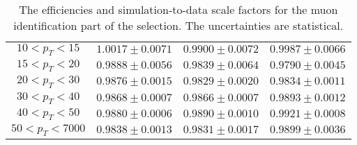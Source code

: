 \begin{table}[!ht]
\begin{center}
\begin{tabular}{c|c|c|c}
\hline 
$ 10 < p_T <  15$ & $1.0017 \pm 0.0071$ & $0.9900 \pm 0.0072$ & $0.9987 \pm 0.0066$  \\
$ 15 < p_T <  20$ & $0.9888 \pm 0.0056$ & $0.9839 \pm 0.0064$ & $0.9790 \pm 0.0045$  \\
$ 20 < p_T <  30$ & $0.9876 \pm 0.0015$ & $0.9829 \pm 0.0020$ & $0.9834 \pm 0.0011$  \\
$ 30 < p_T <  40$ & $0.9868 \pm 0.0007$ & $0.9866 \pm 0.0007$ & $0.9893 \pm 0.0012$  \\
$ 40 < p_T <  50$ & $0.9880 \pm 0.0006$ & $0.9890 \pm 0.0010$ & $0.9921 \pm 0.0008$  \\
$ 50 < p_T < 7000$ & $0.9838 \pm 0.0013$ & $0.9831 \pm 0.0017$ & $0.9899 \pm 0.0036$  \\
\hline
\end{tabular}
\caption{The efficiencies and simulation-to-data scale factors for the muon
identification part of the selection.
The uncertainties are statistical.}
\label{tab:eff_muon_id}
\end{center}
\end{table}

